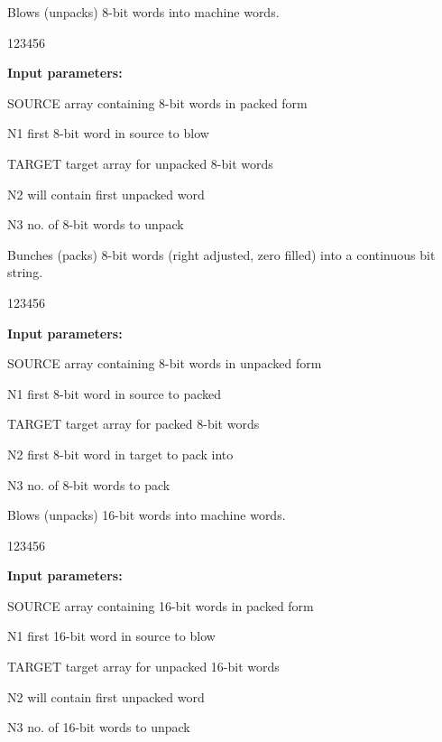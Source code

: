  
Blows (unpacks) 8-bit words into machine words.

\begin{DLtt}{123456}
\item[{\rm\bf Input parameters:}]
\item[SOURCE] array containing 8-bit words in packed form
\item[N1]     first 8-bit word in source to blow
\item[TARGET] target array for unpacked 8-bit words
\item[N2]      will contain first unpacked word
\item[N3]     no. of 8-bit words to unpack
\end{DLtt}

 
Bunches (packs) 8-bit words (right adjusted, zero filled)
into a continuous bit string.

\begin{DLtt}{123456}
\item[{\rm\bf Input parameters:}]
\item[SOURCE] array containing 8-bit words in unpacked form
\item[N1]     first 8-bit word in source to packed
\item[TARGET] target array for packed 8-bit words
\item[N2]     first 8-bit word in target to pack into
\item[N3]     no. of 8-bit words to pack
\end{DLtt}

 
Blows (unpacks) 16-bit words into machine words.

\begin{DLtt}{123456}
\item[{\rm\bf Input parameters:}]
\item[SOURCE] array containing 16-bit words in packed form
\item[N1]     first 16-bit word in source to blow
\item[TARGET] target array for unpacked 16-bit words
\item[N2]      will contain first unpacked word
\item[N3]     no. of 16-bit words to unpack
\end{DLtt}

